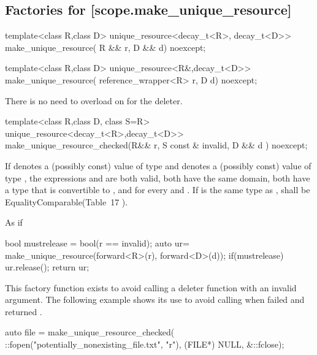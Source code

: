 \documentclass[ebook,11pt,article]{memoir}
\begin{document}
\subsection {Factories for  [scope.make_unique_resource]}
\begin{itemdecl}
template<class R,class D>
unique_resource<decay_t<R>, decay_t<D>>
make_unique_resource( R && r, D && d) noexcept;
\end{itemdecl}

\begin{itemdescr}
\pnum
\returns {}
\end{itemdescr}


\begin{itemdecl}
template<class R,class D>
unique_resource<R&,decay_t<D>>
make_unique_resource( reference_wrapper<R> r, D d) noexcept;
\end{itemdecl}

\begin{itemdescr}
\pnum
\returns {}

\pnum \enternote There is no need to overload on  for the deleter. \exitnote
\end{itemdescr}



\begin{itemdecl}
template<class R,class D, class S=R>
unique_resource<decay_t<R>,decay_t<D>>
make_unique_resource_checked(R&& r, S const & invalid, D && d ) noexcept;
\end{itemdecl}

\begin{itemdescr}
\pnum
\requires 
If  denotes a (possibly const) value of type  and  denotes a
(possibly const) value of type , the expressions  and 
are both valid, both have the same domain, both have a type that is
convertible to , and  for every  and
. If  is the same type as ,  shall be EqualityComparable(Table~17
). 

\pnum
\effects As if
\begin{codeblock}
  bool mustrelease = bool(r == invalid);
  auto ur= make_unique_resource(forward<R>(r), forward<D>(d));
  if(mustrelease) ur.release();
  return ur;
\end{codeblock}

\pnum
\enternote
This factory function exists to avoid calling a deleter function with an invalid argument. The following example shows its use to avoid calling  when  failed and returned .\\
\enterexample
\begin{codeblock}
		auto file = make_unique_resource_checked(
		      ::fopen("potentially_nonexisting_file.txt", "r"), 
		      (FILE*) NULL, 
		      &::fclose);
\end{codeblock}
\exitexample
\exitnote


\end{itemdescr}
\end{document}
